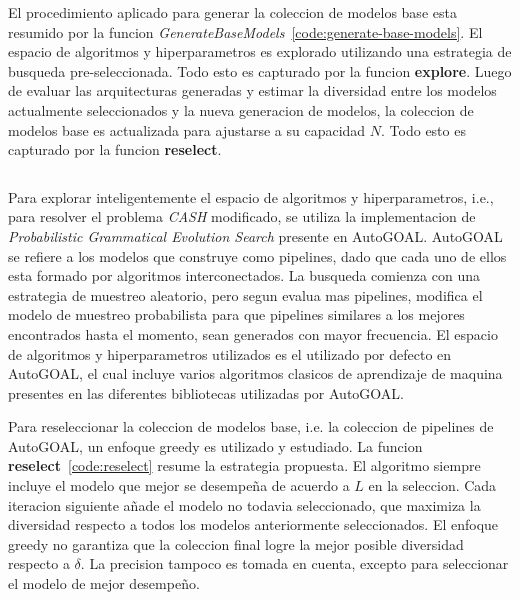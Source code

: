 El procedimiento aplicado para generar la coleccion de modelos base esta resumido por la funcion \textit{GenerateBaseModels}~\ref{code:generate-base-models}. El espacio de algoritmos y hiperparametros es explorado utilizando una estrategia de busqueda pre-seleccionada. Todo esto es capturado por la funcion \textbf{explore}. Luego de evaluar las arquitecturas generadas y estimar la diversidad entre los modelos actualmente seleccionados y la nueva generacion de modelos, la coleccion de modelos base es actualizada para ajustarse a su capacidad $N$. Todo esto es capturado por la funcion \textbf{reselect}.

\begin{equation}
\label{code:generate-base-models}
\end{equation}

Para explorar inteligentemente  el espacio de algoritmos y hiperparametros, i.e., para resolver el problema \textit{CASH} modificado, se utiliza la implementacion de \emph{Probabilistic Grammatical Evolution Search} presente en AutoGOAL. AutoGOAL se refiere a los modelos que construye como pipelines, dado que cada uno de ellos esta formado por algoritmos interconectados. La busqueda comienza con una estrategia de muestreo aleatorio, pero segun evalua mas pipelines, modifica el modelo de muestreo probabilista para que pipelines similares a los mejores encontrados hasta el momento, sean generados con mayor frecuencia. El espacio de algoritmos y hiperparametros utilizados es el utilizado por defecto en AutoGOAL, el cual incluye varios algoritmos clasicos de aprendizaje de maquina presentes en las diferentes bibliotecas utilizadas por AutoGOAL.

Para reseleccionar la coleccion de modelos base, i.e. la coleccion de pipelines de AutoGOAL, un enfoque greedy es utilizado y estudiado. La funcion \textbf{reselect}~\ref{code:reselect} resume la estrategia propuesta. El algoritmo siempre incluye el modelo que mejor se desempeña de acuerdo a $L$ en la seleccion. Cada iteracion siguiente añade el modelo no todavia seleccionado, que maximiza la diversidad respecto a todos los modelos anteriormente seleccionados. El enfoque greedy no garantiza que la coleccion final logre la mejor posible diversidad respecto a $\delta$. La precision tampoco es tomada en cuenta, excepto para seleccionar el modelo de mejor desempeño.

